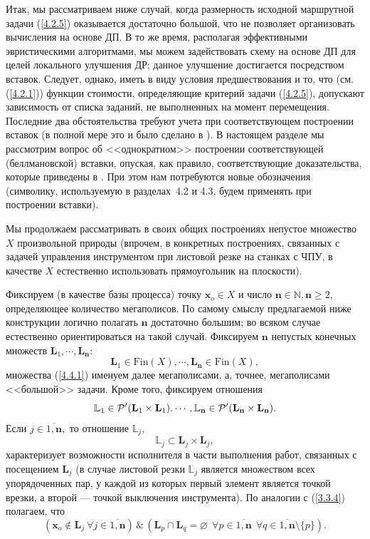 \documentclass[11pt,twoside,openany]{report}
\newcommand{\bfn}{\begin{equation}}
\newcommand{\efn}{\end{equation}}
\newcommand{\ov}{\overline}
\newcommand{\sm}{\setminus}
\newcommand{\fa}{\forall}
\newcommand{\cp}{{\cal P}}
\newcommand{\bbl}{{\mathbb L}}
\newcommand{\bbn}{{\mathbb N}}
\newcommand{\emp}{\varnothing}
\begin{document}
{Итак, мы рассматриваем ниже случай, когда размерность исходной маршрутной задачи (\ref{4.2.5})
оказывается достаточно большой, что не позволяет организовать вычисления на основе ДП.
В то же время, располагая эффективными эвристическими алгоритмами, мы можем задействовать
схему на основе ДП для целей локального улучшения ДР; данное улучшение достигается
посредством  вставок. Следует, однако, иметь в виду условия предшествования и то,
что (см. (\ref{4.2.1})) функции стоимости, определяющие критерий задачи (\ref{4.2.5}),
допускают зависимость от списка заданий, не выполненных на момент перемещения.
Последние два обстоятельства требуют учета при соответствующем построении вставок
(в полной мере это и было сделано в \cite{Cha13`, 15`}). В настоящем разделе мы рассмотрим
вопрос об <<однократном>> построении соответствующей (беллмановской) вставки, опуская,
как правило, соответствующие доказательства, которые приведены в \cite{Cha13`, 15`}.
При этом нам потребуются новые обозначения (символику, используемую в разделах~4.2 и 4.3,
будем применять при построении вставки).

Мы продолжаем рассматривать в своих общих построениях непустое множество $X$
произвольной природы (впрочем, в конкретных построениях, связанных с задачей
управления инструментом при листовой резке на станках с ЧПУ,
в качестве $X$ естественно использовать прямоугольник на плоскости).

Фиксируем (в качестве базы процесса) точку $\mathbf{x}_o\in X$ и число
$\mathbf{n}\in \bbn, \mathbf{n}\geqslant 2,$
определяющее количество мегаполисов. По самому смыслу
предлагаемой ниже конструкции логично полагать $\mathbf{n}$ достаточно
большим; во всяком случае естественно ориентироваться на такой случай.
Фиксируем $\mathbf{n}$ непустых конечных множеств  $\mathbf{L}_1,\cdots,\mathbf{L}_\mathbf{n}:$
\bfn\label{4.4.1}\mathbf{L}_1\in \mathrm{Fin}(X),\cdots,\mathbf{L}_\mathbf{n}\in \mathrm{Fin}(X),
\efn
множества (\ref{4.4.1}) именуем далее мегаполисами, а, точнее,
мегаполисами <<большой>> задачи. Кроме того, фиксируем отношения
\bfn\label{4.4.2}\bbl_1\in \cp^\prime(\mathbf{L}_1 \times \mathbf{L}_1).\cdots,
\bbl_\mathbf{n}\in \cp^\prime(\mathbf{L}_\mathbf{n}\times \mathbf{L}_\mathbf{n}).
\efn
Если $j\in \ov{1,\mathbf{n}},$ то отношение $\bbl_j,$
$$ \bbl_j\subset \mathbf{L}_j \times \mathbf{L}_j,
$$
характеризует возможности исполнителя в части выполнения работ, связанных с
посещением $\mathbf{L}_j$ (в случае листовой резки $\bbl_j$ является множеством
всех упорядоченных пар, у каждой из которых первый элемент является точкой врезки,
а второй --- точкой выключения инструмента). По аналогии с (\ref{3.3.4}) полагаем, что
\bfn\label{4.4.3}
(\mathbf{x}_o\notin \mathbf{L}_j\ \fa j\in \ov{1,\mathbf{n}})\,\&\,(\mathbf{L}_p
\cap \mathbf{L}_q = \emp\ \ \fa p\in \ov{1,\mathbf{n}}\ \ \fa q\in \ov{1,\mathbf{n}}\sm \{p\}).
\efn

}
\end{document}
